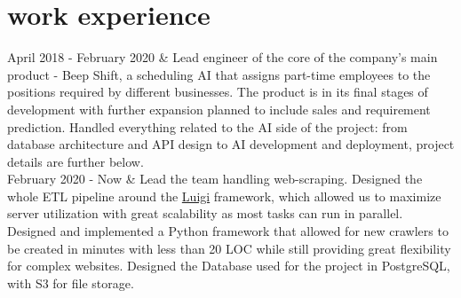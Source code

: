 \documentclass[]{cv-roald}
\begin{document}
\section*{work experience}
\begin{tabularcv}
   April 2018 - February 2020       &   
                    \newline Lead engineer of the core of the company's main product - Beep Shift, a scheduling AI that assigns part-time employees to the positions required by different businesses. The product is in its final stages of development with further expansion planned to include sales and requirement prediction.
                    \newline Handled everything related to the AI side of the project: from database architecture and API design to AI development and deployment, project details are further below.
                    \\[\vspacepar]
  February 2020 - Now   & 
                    \newline Lead the team handling web-scraping. Designed the whole ETL pipeline around the \href{https://luigi.readthedocs.io/en/stable/}{Luigi} framework, which allowed us to maximize server utilization with great scalability as most tasks can run in parallel.
                    \newline Designed and implemented a Python framework that allowed for new crawlers to be created in minutes with less than 20 LOC while still providing great flexibility for complex websites.
                    \newline Designed the Database used for the project in PostgreSQL, with S3 for file storage.
\end{tabularcv}
\end{document}
